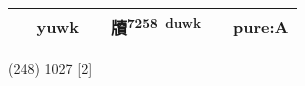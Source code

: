 \documentclass[14pt,a4paper]{scrartcl}
\begin{document}
\begin{longtable}[c]{@{}llllll@{}}
\begin{minipage}[t]{0.14\columnwidth}
𧷗
\strut\end{minipage} &
\begin{minipage}[t]{0.14\columnwidth}\raggedright\strut
yuwk
\strut\end{minipage} &
\begin{minipage}[t]{0.14\columnwidth}\raggedright\strut
\strut\end{minipage} &
\begin{minipage}[t]{0.14\columnwidth}\raggedright\strut
牘\textsuperscript{7258~duwk}
\strut\end{minipage} &
\begin{minipage}[t]{0.14\columnwidth}\raggedright\strut
\strut\end{minipage} &
\begin{minipage}[t]{0.14\columnwidth}\raggedright\strut
pure:A
\strut\end{minipage}\tabularnewline
\bottomrule
\end{longtable}

(248) 1027 {[}2{]}
\end{document}
